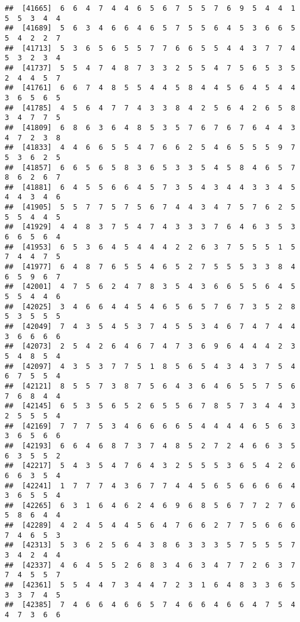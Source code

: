 \documentclass[
]{book}
\begin{document}
\begin{verbatim}
##  [41665]  6  6  4  7  4  4  6  5  6  7  5  5  7  6  9  5  4  4  1  5  5  3  4  4
##  [41689]  5  6  3  4  6  6  4  6  5  7  5  5  6  4  5  3  6  6  5  5  4  2  2  7
##  [41713]  5  3  6  5  6  5  5  7  7  6  6  5  5  4  4  3  7  7  4  5  3  2  3  4
##  [41737]  5  5  4  7  4  8  7  3  3  2  5  5  4  7  5  6  5  3  5  2  4  4  5  7
##  [41761]  6  6  7  4  8  5  5  4  4  5  8  4  4  5  6  4  5  4  4  3  6  5  6  5
##  [41785]  4  5  6  4  7  7  4  3  3  8  4  2  5  6  4  2  6  5  8  3  4  7  7  5
##  [41809]  6  8  6  3  6  4  8  5  3  5  7  6  7  6  7  6  4  4  3  4  7  2  3  8
##  [41833]  4  4  6  6  5  5  4  7  6  6  2  5  4  6  5  5  5  9  7  5  3  6  2  5
##  [41857]  6  6  5  6  5  8  3  6  5  3  3  5  4  5  8  4  6  5  7  8  6  2  6  7
##  [41881]  6  4  5  5  6  6  4  5  7  3  5  4  3  4  4  3  3  4  5  4  4  3  4  6
##  [41905]  5  5  7  7  5  7  5  6  7  4  4  3  4  7  5  7  6  2  5  5  5  4  4  5
##  [41929]  4  4  8  3  7  5  4  7  4  3  3  3  7  6  4  6  3  5  3  6  6  5  6  4
##  [41953]  6  5  3  6  4  5  4  4  4  2  2  6  3  7  5  5  5  1  5  7  4  4  7  5
##  [41977]  6  4  8  7  6  5  5  4  6  5  2  7  5  5  5  3  3  8  4  6  5  9  6  7
##  [42001]  4  7  5  6  2  4  7  8  3  5  4  3  6  6  5  5  6  4  5  5  5  4  4  6
##  [42025]  3  4  6  6  4  4  5  4  6  5  6  5  7  6  7  3  5  2  8  5  3  5  5  5
##  [42049]  7  4  3  5  4  5  3  7  4  5  5  3  4  6  7  4  7  4  4  3  6  6  6  6
##  [42073]  2  5  4  2  6  4  6  7  4  7  3  6  9  6  4  4  4  2  3  5  4  8  5  4
##  [42097]  4  3  5  3  7  7  5  1  8  5  6  5  4  3  4  3  7  5  4  6  7  5  5  4
##  [42121]  8  5  5  7  3  8  7  5  6  4  3  6  4  6  5  5  7  5  6  7  6  8  4  4
##  [42145]  6  5  3  5  6  5  2  6  5  5  6  7  8  5  7  3  4  4  3  2  5  5  5  4
##  [42169]  7  7  7  5  3  4  6  6  6  6  5  4  4  4  4  6  5  6  3  3  6  5  6  6
##  [42193]  6  6  4  6  8  7  3  7  4  8  5  2  7  2  4  6  6  3  5  6  3  5  5  2
##  [42217]  5  4  3  5  4  7  6  4  3  2  5  5  5  3  6  5  4  2  6  6  6  3  5  4
##  [42241]  1  7  7  7  4  3  6  7  7  4  4  5  6  5  6  6  6  6  4  3  6  5  5  4
##  [42265]  6  3  1  6  4  6  2  4  6  9  6  8  5  6  7  7  2  7  6  5  8  6  4  4
##  [42289]  4  2  4  5  4  4  5  6  4  7  6  6  2  7  7  5  6  6  6  7  4  6  5  3
##  [42313]  5  3  6  2  5  6  4  3  8  6  3  3  3  5  7  5  5  5  7  3  4  2  4  4
##  [42337]  4  6  4  5  5  2  6  8  3  4  6  3  4  7  7  2  6  3  7  7  4  5  5  7
##  [42361]  5  5  4  4  7  3  4  4  7  2  3  1  6  4  8  3  3  6  5  3  3  7  4  5
##  [42385]  7  4  6  6  4  6  6  5  7  4  6  6  4  6  6  4  7  5  4  4  7  3  6  6

\end{verbatim}
\end{document}
